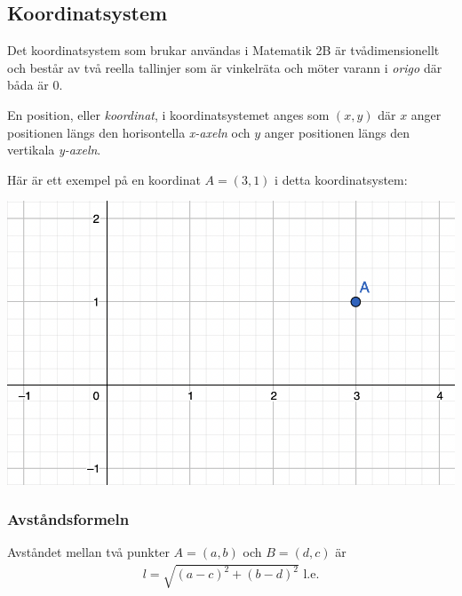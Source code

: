\subsection{Koordinatsystem}
\label{Koordinatsystem}

Det koordinatsystem som brukar användas i Matematik 2B är tvådimensionellt och består av två reella tallinjer som är vinkelräta och möter varann i \textit{origo} där båda är $0$.

En position, eller \textit{koordinat}, i koordinatsystemet anges som $(x, y)$ där $x$ anger positionen längs den horisontella \textit{x-axeln} och $y$ anger positionen längs den vertikala \textit{y-axeln}.

Här är ett exempel på en koordinat $A = (3, 1)$ i detta koordinatsystem:

\includegraphics[width=\textwidth]{img/1.png}

\newpage
\subsubsection{Avståndsformeln}

\begin{theorem}[Avståndsformeln]
	Avståndet mellan två punkter $A=(a,b)$ och $B=(d,c)$ är
	\begin{align}
		l = \sqrt{(a-c)^2+(b-d)^2} \text{ l.e}.
	\end{align}
\end{theorem}

